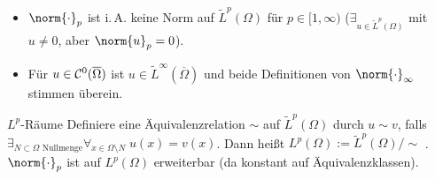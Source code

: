 \begin{Bem}
    \begin{itemize}
        \item
        $\norm{\cdot}_p$ ist i.\,A. keine Norm auf $\widetilde{L}^p(\Omega)$ für
        $p \in [1, \infty)$
        ($\exists_{u \in \widetilde{L}^p(\Omega)}$ mit $u \not= 0$, aber $\norm{u}_p = 0$).
        
        \item
        Für $u \in \mathcal{C}^0(\overline{\Omega})$ ist $u \in \widetilde{L}^\infty(\overline{\Omega})$ und
        beide Definitionen von $\norm{\cdot}_\infty$ stimmen überein.
    \end{itemize}
\end{Bem}

\linie

\begin{Def}{$L^p$-Räume}
    Definiere eine Äquivalenzrelation $\sim$ auf $\widetilde{L}^p(\Omega)$ durch
    $u \sim v$, falls\\
    $\exists_{\text{$N \subset \Omega$ Nullmenge}}
    \forall_{x \in \Omega \setminus N}\; u(x) = v(x)$.
    Dann heißt $L^p(\Omega) := \widetilde{L}^p(\Omega)/\!\sim$ .\\
    $\norm{\cdot}_p$ ist auf $L^p(\Omega)$ erweiterbar (da konstant auf Äquivalenzklassen).
\end{Def}

